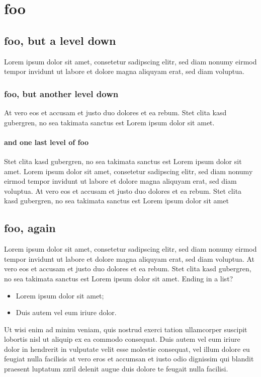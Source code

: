 \documentclass[10pt,twoside,twocolumn,openany,nodeprecatedcode]{dndbook}
\begin{document}
\section{foo} \label{sec:foo}
\subsection{foo, but a level down} \label{sec:foo,_but_a_level_down}
Lorem ipsum dolor sit amet, consetetur sadipscing elitr, sed diam nonumy eirmod tempor invidunt ut labore et dolore magna aliquyam erat, sed diam voluptua. 
\subsubsection{foo, but another level down} \label{sec:foo,_but_another_level_down}
At vero eos et accusam et justo duo dolores et ea rebum. Stet clita kasd gubergren, no sea takimata sanctus est Lorem ipsum dolor sit amet.
\paragraph{and one last level of foo} \label{sec:and_one_last_level_of_foo}
Stet clita kasd gubergren, no sea takimata sanctus est Lorem ipsum dolor sit amet. Lorem ipsum dolor sit amet, consetetur sadipscing elitr, sed diam nonumy eirmod tempor invidunt ut labore et dolore magna aliquyam erat, sed diam voluptua.
At vero eos et accusam et justo duo dolores et ea rebum. Stet clita kasd gubergren, no sea takimata sanctus est Lorem ipsum dolor sit amet
\subsection{foo, again} \label{sec:foo,_again}
Lorem ipsum dolor sit amet, consetetur sadipscing elitr, sed diam nonumy eirmod tempor invidunt ut labore et dolore magna aliquyam erat, sed diam voluptua. At vero eos et accusam et justo duo dolores et ea rebum. Stet clita kasd gubergren, no sea takimata sanctus est Lorem ipsum dolor sit amet. Ending in a list?
\begin{itemize}

\item Lorem ipsum dolor sit amet;
\item Duis autem vel eum iriure dolor.
\end{itemize}


Ut wisi enim ad minim veniam, quis nostrud exerci tation ullamcorper suscipit lobortis nisl ut aliquip ex ea commodo consequat. Duis autem vel eum iriure dolor in hendrerit in vulputate velit esse molestie consequat, vel illum dolore eu feugiat nulla facilisis at vero eros et accumsan et iusto odio dignissim qui blandit praesent luptatum zzril delenit augue duis dolore te feugait nulla facilisi. 
\end{document}
